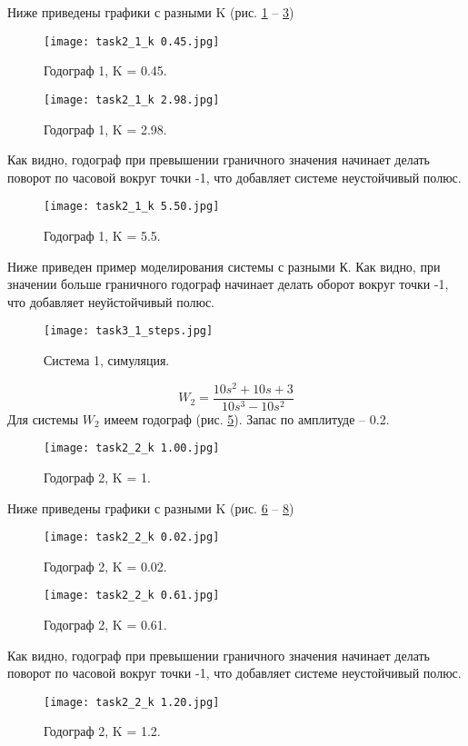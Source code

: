 \documentclass[16pt]{article}
\begin{document}
Ниже приведены графики с разными K (рис. \ref*{fig:fig21} -- \ref*{fig:fig23})
\begin{figure}[h!]
    \centering
    \texttt{[image: task2\_1\_k 0.45.jpg]}
    \caption{Годограф 1, K = 0.45.}
    \label{fig:fig21}
\end{figure}
\begin{figure}[h!]
    \centering
    \texttt{[image: task2\_1\_k 2.98.jpg]}
    \caption{Годограф 1, K = 2.98.}
    \label{fig:fig22}
\end{figure}
Как видно, годограф при превышении граничного значения начинает делать поворот по часовой вокруг точки -1, что добавляет системе неустойчивый полюс.
\begin{figure}[h!]
    \centering
    \texttt{[image: task2\_1\_k 5.50.jpg]}
    \caption{Годограф 1, K = 5.5.}
    \label{fig:fig23}
\end{figure}

Ниже приведен пример моделирования системы с разными К. Как видно, при значении больше граничного годограф начинает делать оборот вокруг точки -1, что добавляет неуйстойчивый полюс.

\begin{figure}[h!]
    \centering
    \texttt{[image: task3\_1\_steps.jpg]}
    \caption{Система 1, симуляция.}
    \label{fig:fig24}
\end{figure}

\[W_2 = \frac{10s^2 + 10s + 3}{10s^3 - 10s^2}\]
Для системы \(W_2\) имеем годограф (рис. \ref*{fig:fig25}). Запас по амплитуде -- 0.2.
\begin{figure}[h!]
    \centering
    \texttt{[image: task2\_2\_k 1.00.jpg]}
    \caption{Годограф 2, K = 1.}
    \label{fig:fig25}
\end{figure}

Ниже приведены графики с разными K (рис. \ref*{fig:fig26} -- \ref*{fig:fig28})
\begin{figure}[h!]
    \centering
    \texttt{[image: task2\_2\_k 0.02.jpg]}
    \caption{Годограф 2, K = 0.02.}
    \label{fig:fig26}
\end{figure}
\begin{figure}[h!]
    \centering
    \texttt{[image: task2\_2\_k 0.61.jpg]}
    \caption{Годограф 2, K = 0.61.}
    \label{fig:fig27}
\end{figure}
Как видно, годограф при превышении граничного значения начинает делать поворот по часовой вокруг точки -1, что добавляет системе неустойчивый полюс.
\begin{figure}[h!]
    \centering
    \texttt{[image: task2\_2\_k 1.20.jpg]}
    \caption{Годограф 2, K = 1.2.}
    \label{fig:fig28}
\end{figure}
\end{document}
